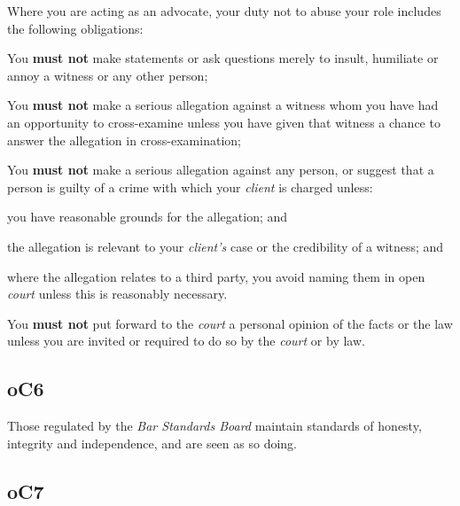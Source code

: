 Where you are acting as an advocate, your duty not to abuse your role
includes the following obligations:
\begin{numlist}\item You \textcolor{myred}{\textbf{must not}} make statements or ask questions merely to insult,
humiliate or annoy a witness or any other person;
\item You \textcolor{myred}{\textbf{must not}} make a serious allegation against a witness whom you
have had an opportunity to cross-examine unless you have given that
witness a chance to answer the allegation in cross-examination;
\item You \textcolor{myred}{\textbf{must not}} make a serious allegation against any person, or suggest
that a person is guilty of a crime with which your \emph{client} is
charged unless:
\begin{alphlist}
\item you have reasonable grounds for the allegation; and

\item the allegation is relevant to your \emph{client's} case or the
credibility of a witness; and

\item where the allegation relates to a third party, you avoid naming them
in open \emph{court} unless this is reasonably necessary.
\end{alphlist}
\item You \textcolor{myred}{\textbf{must not}} put forward to the \emph{court} a personal opinion of
the facts or the law unless you are invited or required to do so by the
\emph{court} or by law.
\end{numlist}






\subsection{\color{bleu}oC6}

Those regulated by the \emph{Bar Standards Board} maintain standards of
honesty, integrity and independence, and are seen as so doing.

\subsection{\color{bleu}oC7}

